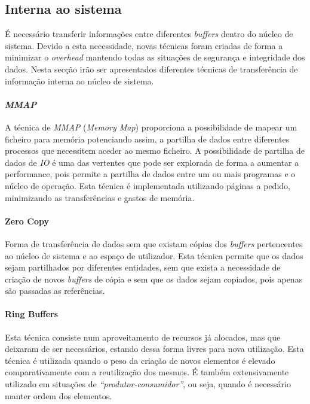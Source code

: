 \subsection{Interna ao sistema}

É necessário transferir informações entre diferentes \textit{buffers} dentro do núcleo de sistema. Devido a esta necessidade, novas técnicas foram criadas de forma a minimizar o \textit{overhead} mantendo todas as situações de segurança e integridade dos dados. Nesta secção irão ser apresentados diferentes técnicas de transferência de informação interna ao núcleo de sistema.

\paragraph*{\textit{MMAP}}\label{par:MMAP_overview}
A técnica de \textit{MMAP} (\textit{Memory Map}) proporciona a possibilidade de mapear um ficheiro para memória potenciando assim, a partilha de dados entre diferentes processos que necessitem aceder ao mesmo ficheiro. A possibilidade de partilha de dados de \textit{IO} é uma das vertentes que pode ser explorada de forma a aumentar a performance, pois permite a partilha de dados entre um ou mais programas e o núcleo de operação. Esta técnica é implementada utilizando páginas a pedido, minimizando as transferências e gastos de memória.

\paragraph*{Zero Copy}\label{par:zero_copy_overview}

Forma de transferência de dados sem que existam cópias dos \textit{buffers} pertencentes ao núcleo de sistema e ao espaço de utilizador. Esta técnica permite que os dados sejam partilhados por diferentes entidades, sem que exista a necessidade de criação de novos \textit{buffers} de cópia e sem que os dados sejam copiados, pois apenas são passadas as referências.

\paragraph*{Ring Buffers}\label{c}
Esta técnica consiste num aproveitamento de recursos já alocados, mas que deixaram de ser necessários, estando dessa forma livres para nova utilização. Esta técnica é utilizada quando o peso da criação de novos elementos é elevado comparativamente com a reutilização dos mesmos. É também extensivamente utilizado em situações de \textit{``produtor-consumidor''}, ou seja, quando é necessário manter ordem dos elementos.

